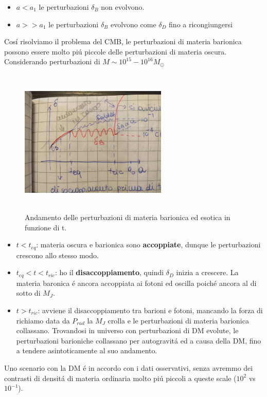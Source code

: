 \documentclass[12pt, a4paper]{article}
\begin{document}
\begin{itemize}
\item $a<a_1$ le perturbazioni $\delta_B$ non evolvono.
\item $a>>a_1$ le perturbazioni $\delta_B$ evolvono come $\delta_D$ fino a ricongiungersi
\end{itemize}
Cos\'{i} risolviamo il problema del CMB, le perturbazioni di materia barionica possono essere molto pi\'{u} piccole delle perturbazioni di materia oscura.\\
Considerando perturbazioni di $M\sim 10^{15}-10^{16} M_\odot\ $
\begin{figure}[htp]
\centering
\includegraphics[width=7cm, height=7cm]{images/pertosc1.jpeg}
\caption{Andamento delle perturbazioni di materia barionica ed esotica in funzione di t.}
\label{fig:pertosc1}
\end{figure}
\begin{itemize}
\item \underline{$t<t_{eq}$}: materia oscura e barionica sono \textbf{accoppiate}, dunque le perturbazioni crescono allo stesso modo.
\item \underline{$t_{eq}<t<t_{ric}$}: ho il \textbf{disaccoppiamento}, quindi $\delta_D$ inizia a crescere. La materia baronica \'{e} ancora accoppiata ai fotoni ed oscilla poich\'{e} ancora al di sotto di $M_J$.
\item \underline{$t>t_{ric}$}: avviene il disaccoppiamento tra barioni e fotoni, mancando la forza di richiamo data da $P_{rad}$ la $M_J$ crolla e le perturbazioni di materia barionica collassano. Trovandosi in universo con perturbazioni di DM evolute, le perturbazioni barioniche collassano per autogravit\'{a} ed a causa della DM, fino a tendere asintoticamente al suo andamento.
\end{itemize}
Uno scenario con la DM \'{e} in accordo con i dati osservativi, senza avremmo dei contrasti di densit\'{a} di materia ordinaria molto pi\'{u} piccoli a queste scale ($10^2$ vs $10^{-1}$). \\
\end{document}
